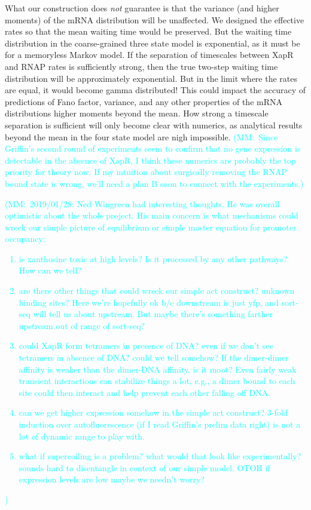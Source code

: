 \documentclass[12pt]{article}%
\newcommand{\mmnote}[1]{\textcolor{cyan}{(MM:~#1)}}
\begin{document}
What our construction does \textit{not} guarantee is that the variance
(and higher moments) of the mRNA distribution will be unaffected.
We designed the effective rates so that the mean waiting time would be preserved.
But the waiting time distribution in the coarse-grained three state model
is exponential, as it must be for a memoryless Markov model.
If the separation of timescales between XapR and RNAP rates is sufficiently strong,
then the true two-step waiting time distribution will be approximately exponential.
But in the limit where the rates are equal, it would become gamma distributed!
This could impact the accuracy of predictions of Fano factor, variance,
and any other properties of the mRNA distributions higher moments beyond the mean.
How strong a timescale separation is sufficient will only become clear with numerics,
as analytical results beyond the mean in the four state model are nigh impossible.
\mmnote{Since Griffin's second round of experiments seem to confirm that
no gene expression is detectable in the absence of XapR,
I think these numerics are probably the top priority for theory now.
If my intuition about surgically removing the RNAP bound state is wrong,
we'll need a plan B soon to connect with the experiments.}

\mmnote{2019/01/28: Ned Wingreen had interesting thoughts.
He was overall optimistic about the whole project.
His main concern is what mechanisms could wreck our simple picture of
equilibrium or simple master equation for promoter occupancy:
\begin{enumerate}
\item is xanthosine toxic at high levels? Is it processed by any other pathways? How can we tell?
\item are there other things that could wreck our simple act construct? unknown binding sites?
Here we're hopefully ok b/c downstream is just yfp, and sort-seq will tell us about upstream.
But maybe there's something farther upstream out of range of sort-seq?
\item could XapR form tetramers in presence of DNA?
even if we don't see tetramers in absence of DNA?
could we tell somehow?
If the dimer-dimer affinity is weaker than the dimer-DNA affinity, is it moot?
Even fairly weak transient interactions can stabilize things a lot,
e.g., a dimer bound to each site could then interact and help prevent each other falling off DNA.
\item can we get higher expression somehow in the simple act construct?
3-fold induction over autofluorescence (if I read Griffin's prelim data right)
is not a lot of dynamic range to play with.
\item what if supercoiling is a problem? what would that look like experimentally?
sounds hard to disentangle in context of our simple model.
OTOH if expression levels are low maybe we needn't worry?
\end{enumerate}}
\end{document}

